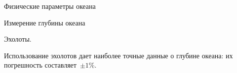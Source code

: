 \begin{chapter}{Физические параметры океана}
\begin{section}{Измерение глубины океана}
\begin{paragraph}{Эхолоты.}




Использование эхолотов дает наиболее точные данные о глубине океана:
их погрешность составляет~$\pm1$\%.
\end{paragraph}


\end{section}
\end{chapter}
